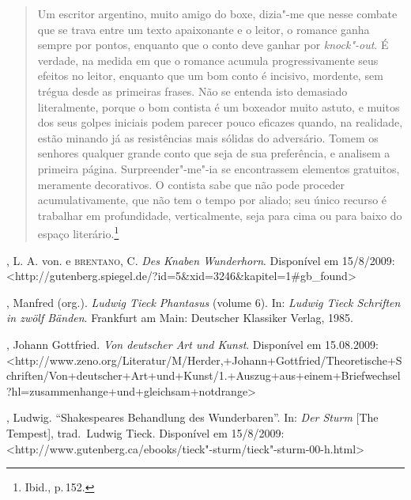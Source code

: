 \begin{quote}
Um escritor argentino, muito amigo do boxe, dizia"-me que nesse combate que se trava entre um texto apaixonante e o leitor, o romance ganha sempre por pontos, enquanto que o conto deve ganhar por \textit{knock"-out}. É verdade, na medida em que o romance acumula progressivamente seus efeitos no leitor, enquanto que um bom conto é incisivo, mordente, sem trégua desde as primeiras frases. Não se entenda isto demasiado literalmente, porque o bom contista é um boxeador muito astuto, e muitos dos seus golpes iniciais podem parecer pouco eficazes quando, na realidade, estão minando já as resistências mais sólidas do adversário.
Tomem os senhores qualquer grande conto que seja de sua preferência, e analisem a primeira página. Surpreender"-me"-ia se encontrassem elementos gratuitos, meramente decorativos. O contista sabe que não pode proceder acumulativamente, que não tem o tempo por aliado; seu único recurso é trabalhar em profundidade, verticalmente, seja para cima ou para baixo do espaço literário.\footnote{Ibid., p.\,152.}
\end{quote}


\begin{bibliohedra}

, L. A. von. e \textsc{brentano}, C. \textit{Des Knaben Wunderhorn}.
Disponível em 15/8/2009: 
<http://gutenberg.spiegel.de/?id=5\&xid=3246\&\break kapitel=1\#gb\_found>

, Manfred (org.). \textit{Ludwig Tieck Phantasus }(volume
6). In: \textit{Ludwig Tieck Schriften in zwölf Bänden}.  Frankfurt am
Main: Deutscher Klassiker Verlag, 1985. 

, Johann Gottfried. \textit{Von deutscher Art und Kunst}.
Disponível em 15.08.2009: <http://www.zeno.org/Literatur/M/Herder,+Johann\break+Gottfried/Theoretische+Schriften/Von+deutscher+Art+und+\break Kunst/1.+Auszug+aus+einem+Briefwechsel?hl=zusammenhange\break +und+gleichsam+notdrange>

, Ludwig. “Shakespeares Behandlung des Wunderbaren”. In:
\textit{Der Sturm} [The Tempest], trad.~Ludwig Tieck. Disponível em 15/8/2009: 
<http://www.gutenberg.ca/ebooks/tieck"-sturm/tieck"-sturm-00-h.html>

\end{bibliohedra}


















